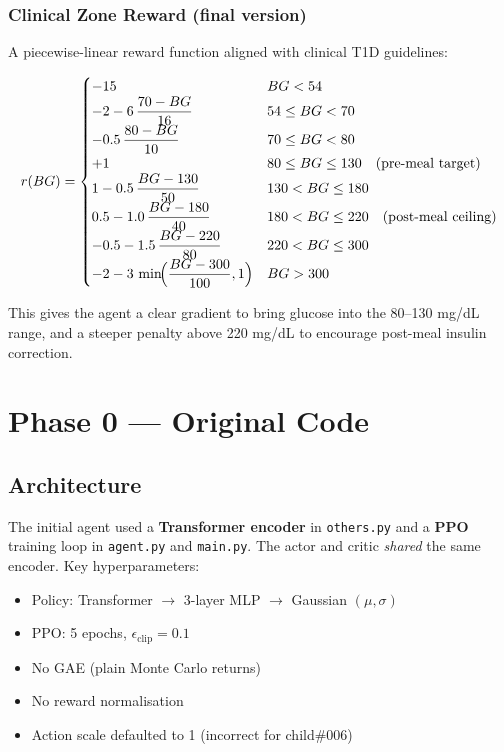 \documentclass[11pt,a4paper]{article}
\begin{document}
\subsubsection*{Clinical Zone Reward (final version)}
A piecewise-linear reward function aligned with clinical T1D guidelines:

\begin{equation}
r(BG) = \begin{cases}
-15 & BG < 54 \\
-2 - 6\,\dfrac{70 - BG}{16} & 54 \le BG < 70 \\
-0.5\,\dfrac{80 - BG}{10} & 70 \le BG < 80 \\
+1 & 80 \le BG \le 130 \quad \text{(pre-meal target)} \\
1 - 0.5\,\dfrac{BG - 130}{50} & 130 < BG \le 180 \\
0.5 - 1.0\,\dfrac{BG - 180}{40} & 180 < BG \le 220 \quad \text{(post-meal ceiling)} \\
-0.5 - 1.5\,\dfrac{BG - 220}{80} & 220 < BG \le 300 \\
-2 - 3\,\min\!\Bigl(\dfrac{BG-300}{100},1\Bigr) & BG > 300
\end{cases}
\label{eq:clinical_reward}
\end{equation}

This gives the agent a clear gradient to bring glucose into the 80--130 mg/dL range,
and a steeper penalty above 220 mg/dL to encourage post-meal insulin correction.

\section{Phase 0 — Original Code}

\subsection{Architecture}
The initial agent used a \textbf{Transformer encoder} in \texttt{others.py} and a
\textbf{PPO} training loop in \texttt{agent.py} and \texttt{main.py}. The actor and critic
\emph{shared} the same encoder. Key hyperparameters:

\begin{itemize}
    \item Policy: Transformer $\to$ 3-layer MLP $\to$ Gaussian $(\mu, \sigma)$
    \item PPO: 5 epochs, $\epsilon_\text{clip} = 0.1$
    \item No GAE (plain Monte Carlo returns)
    \item No reward normalisation
    \item Action scale defaulted to 1 (incorrect for child\#006)
\end{itemize}
\end{document}

